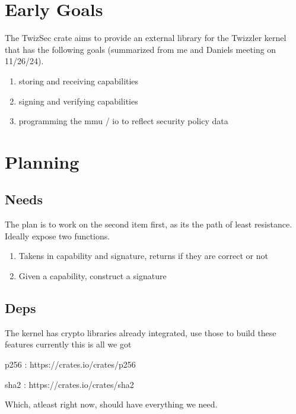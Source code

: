 \documentclass{article}
\title{\ASSIGNMENT}
\author{\NAME}
\date{\CLASS}
\begin{document}
\pagestyle{fancy}
\fancyfoot{}
\fancyhead{}
\fancyfoot[L]{\ASSIGNMENT\ -- \CLASS\ -- \NAME}
\fancyfoot[R]{\thepage}

\maketitle


\section{Early Goals}

The TwizSec crate aims to provide an external library for the Twizzler kernel that has
the following goals (summarized from me and Daniels meeting on 11/26/24).
\begin{enumerate}
    \item storing and receiving capabilities
    \item signing and verifying capabilities
    \item programming the mmu / io to reflect security policy data
\end{enumerate}

\section{Planning}


\subsection{Needs}
The plan is to work on the second item first, as its the path of least resistance.
Ideally expose two functions.
\begin{enumerate}
    \item Takens in capability and signature, returns if they are correct or not
    \item Given a capability, construct a signature
\end{enumerate}

\subsection{Deps}
The kernel has crypto libraries already integrated, use those to build these features
currently this is all we got

p256 : https://crates.io/crates/p256

sha2 : https://crates.io/crates/sha2

Which, atleast right now, should have everything we need.
\end{document}
